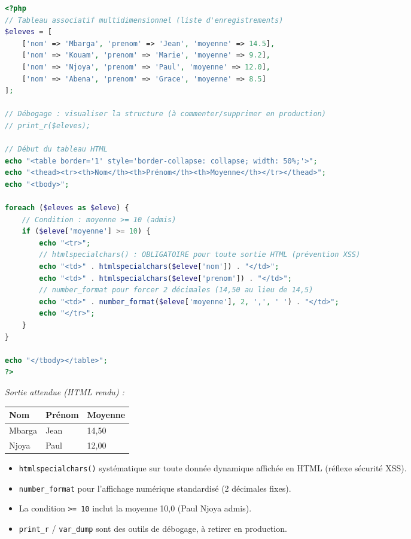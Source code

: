 \documentclass[11pt]{article}
\begin{document}
\begin{corrige}

\begin{lstlisting}[language=Php]
<?php
// Tableau associatif multidimensionnel (liste d'enregistrements)
$eleves = [
    ['nom' => 'Mbarga', 'prenom' => 'Jean', 'moyenne' => 14.5],
    ['nom' => 'Kouam', 'prenom' => 'Marie', 'moyenne' => 9.2],
    ['nom' => 'Njoya', 'prenom' => 'Paul', 'moyenne' => 12.0],
    ['nom' => 'Abena', 'prenom' => 'Grace', 'moyenne' => 8.5]
];

// Débogage : visualiser la structure (à commenter/supprimer en production)
// print_r($eleves); 

// Début du tableau HTML
echo "<table border='1' style='border-collapse: collapse; width: 50%;'>";
echo "<thead><tr><th>Nom</th><th>Prénom</th><th>Moyenne</th></tr></thead>";
echo "<tbody>";

foreach ($eleves as $eleve) {
    // Condition : moyenne >= 10 (admis)
    if ($eleve['moyenne'] >= 10) {
        echo "<tr>";
        // htmlspecialchars() : OBLIGATOIRE pour toute sortie HTML (prévention XSS)
        echo "<td>" . htmlspecialchars($eleve['nom']) . "</td>";
        echo "<td>" . htmlspecialchars($eleve['prenom']) . "</td>";
        // number_format pour forcer 2 décimales (14,50 au lieu de 14,5)
        echo "<td>" . number_format($eleve['moyenne'], 2, ',', ' ') . "</td>";
        echo "</tr>";
    }
}

echo "</tbody></table>";
?>
\end{lstlisting}

\emph{Sortie attendue (HTML rendu) :}
\begin{center}
\begin{tabular}{|l|l|l|}
\hline
\textbf{Nom} & \textbf{Prénom} & \textbf{Moyenne} \\ \hline
Mbarga & Jean & 14,50 \\ \hline
Njoya & Paul & 12,00 \\ \hline
\end{tabular}
\end{center}

\begin{attention}
\begin{itemize}
    \item \texttt{htmlspecialchars()} systématique sur toute donnée dynamique affichée en HTML (réflexe sécurité XSS).
    \item \texttt{number\_format} pour l'affichage numérique standardisé (2 décimales fixes).
    \item La condition \texttt{>= 10} inclut la moyenne 10,0 (Paul Njoya admis).
    \item \texttt{print\_r} / \texttt{var\_dump} sont des outils de débogage, à retirer en production.
\end{itemize}
\end{attention}
\end{corrige}
\end{document}
